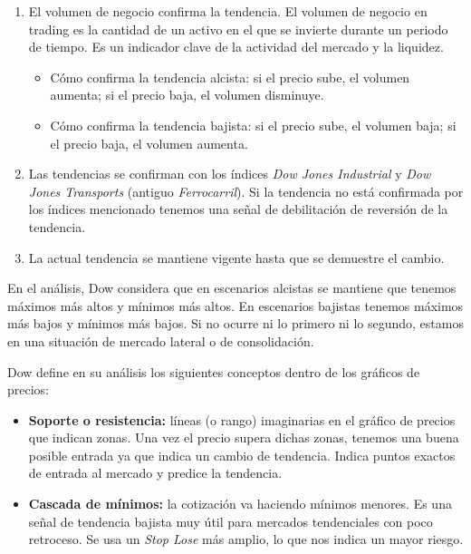 \begin{enumerate}
	\item El volumen de negocio confirma la tendencia. El volumen de negocio en trading es la cantidad de un activo en el que se invierte durante un periodo de tiempo. Es un indicador clave de la actividad del mercado y la liquidez.
	\begin{itemize}
		\item Cómo confirma la tendencia alcista: si el precio sube, el volumen aumenta; si el precio baja, el volumen disminuye.
		\item Cómo confirma la tendencia bajista: si el precio sube, el volumen baja; si el precio baja, el volumen aumenta.
	\end{itemize} 
	\item Las tendencias se confirman con los índices \textit{Dow Jones Industrial} y \textit{Dow Jones Transports} (antiguo \textit{Ferrocarril}). Si la tendencia no está confirmada por los índices mencionado tenemos una señal de debilitación de reversión de la tendencia.
	\item La actual tendencia se mantiene vigente hasta que se demuestre el cambio.
	
\end{enumerate} 

En el análisis, Dow considera que en escenarios alcistas se mantiene que tenemos máximos más altos y mínimos más altos. En escenarios bajistas tenemos máximos más bajos y mínimos más bajos. Si no ocurre ni lo primero ni lo segundo, estamos en una situación de mercado lateral o de consolidación. \newline

Dow define en su análisis los siguientes conceptos dentro de los gráficos de precios: \newline

\begin{itemize}
	\item \textbf{Soporte o resistencia:} líneas (o rango) imaginarias en el gráfico de precios que indican zonas. Una vez el precio supera dichas zonas, tenemos una buena posible entrada ya que indica un cambio de tendencia. Indica puntos exactos de entrada al mercado y predice la tendencia.
	\item \textbf{Cascada de mínimos:} la cotización va haciendo mínimos menores. Es una señal de tendencia bajista muy útil para mercados tendenciales con poco retroceso. Se usa un \textit{Stop Lose} más amplio, lo que nos indica un mayor riesgo.
\end{itemize}

